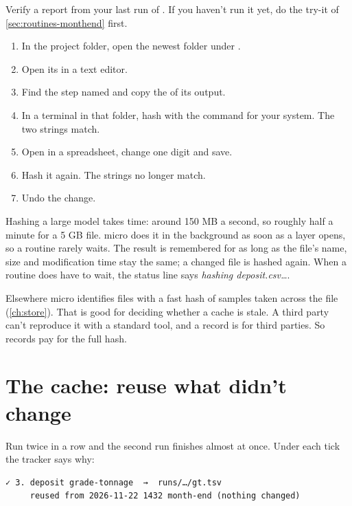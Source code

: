 \begin{tryit}
Verify a report from your last run of . If you haven't run it yet, do the try-it of \cref{sec:routines-monthend} first.
\begin{enumerate}
\item In the project folder, open the newest folder under .
\item Open its  in a text editor.
\item Find the step named  and copy the  of its output.
\item In a terminal in that folder, hash  with the command for your system. The two strings match.
\item Open  in a spreadsheet, change one digit and save.
\item Hash it again. The strings no longer match.
\item Undo the change.
\end{enumerate}
\end{tryit}

Hashing a large model takes time: around 150 MB a second, so roughly half a minute for a 5 GB file. micro does it in the background as soon as a layer opens, so a routine rarely waits. The result is remembered for as long as the file's name, size and modification time stay the same; a changed file is hashed again. When a routine does have to wait, the status line says \emph{hashing deposit.csv…}.

\begin{why}
Elsewhere micro identifies files with a fast hash of samples taken across the file (\cref{ch:store}). That is good for deciding whether a cache is stale. A third party can't reproduce it with a standard tool, and a record is for third parties. So records pay for the full hash.
\end{why}

\section{The cache: reuse what didn't change}\label{sec:records-cache}
Run  twice in a row and the second run finishes almost at once. Under each tick the tracker says why:

\begin{lstlisting}
✓ 3. deposit grade-tonnage  →  runs/…/gt.tsv
     reused from 2026-11-22 1432 month-end (nothing changed)
\end{lstlisting}

